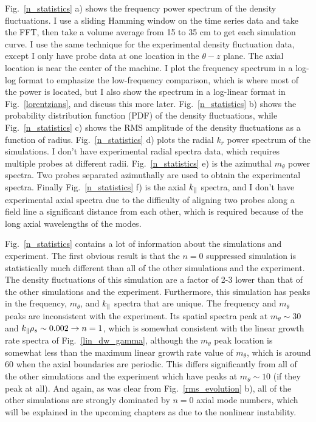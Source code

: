 Fig.~\ref{n_statistics} a) shows the frequency power spectrum of the density fluctuations. I use a sliding Hamming window on the time series data and take the FFT, then take a volume
average from 15 to 35 cm to get each simulation curve. I use the same technique for the experimental density fluctuation data, except I only have probe data at one location in the
$\theta-z$ plane. The axial location is near the center of the machine. I plot the frequency spectrum in a log-log format to emphasize the low-frequency comparison, which is where most of the
power is located, but I also show the spectrum in a log-linear format in Fig.~\ref{lorentzians}, and discuss this more later.
Fig.~\ref{n_statistics} b) shows the probability distribution function (PDF) of the density fluctuations,
while Fig.~\ref{n_statistics} c) shows the RMS amplitude of the density fluctuations as a function of radius. Fig.~\ref{n_statistics} d) plots the radial $k_r$ power spectrum of the simulations.
I don't have experimental radial spectra data, which requires multiple probes at different radii. Fig.~\ref{n_statistics} e) is the azimuthal $m_\theta$ power spectra. 
Two probes separated azimuthally are used to obtain the experimental spectra. Finally Fig.~\ref{n_statistics} f) is the axial $k_\parallel$ spectra, and I don't have experimental axial spectra due
to the difficulty of aligning two probes along a field line a significant distance from each other, which is required because of the long axial wavelengths of the modes.

Fig.~\ref{n_statistics} contains a lot of information about the simulations and experiment. The first obvious result is that the $n=0$ suppressed simulation is statistically much different
than all of the other simulations and the experiment. The density fluctuations of this simulation are a factor of 2-3 lower than that of the other simulations and the experiment.
Furthermore, this simulation has peaks in the frequency, $m_\theta$, and $k_\parallel$ spectra that are unique. The frequency and $m_\theta$ peaks are inconsistent with the experiment. 
Its spatial spectra peak at
$m_\theta \sim 30$ and $k_\parallel \rho_s \sim 0.002 \rightarrow n = 1$, which is somewhat consistent with the linear growth rate spectra of Fig.~\ref{lin_dw_gamma}, although the $m_\theta$
peak location is somewhat less than the maximum linear growth rate value of $m_\theta$, which is around 60 when the axial boundaries are periodic. 
This differs significantly from all of the other simulations and the experiment which have peaks at $m_\theta \sim 10$ (if they peak at all).
And again, as was clear from Fig.~\ref{rms_evolution} b), all of the other simulations are strongly dominated by $n=0$ axial mode numbers, which will be explained
in the upcoming chapters as due to the nonlinear instability.

